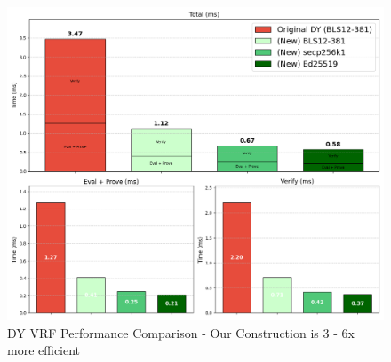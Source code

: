 \begin{figure}[!htb]
    \centering
    \includegraphics[width=1\linewidth]{figures/chap4_dy_comparisons.png}
        \caption[Our DY VRF Construction is 3 - 6x more efficient]{DY VRF Performance Comparison - Our Construction is 3 - 6x more efficient}
    \label{fig:chap4_public_vrf}
\end{figure}

